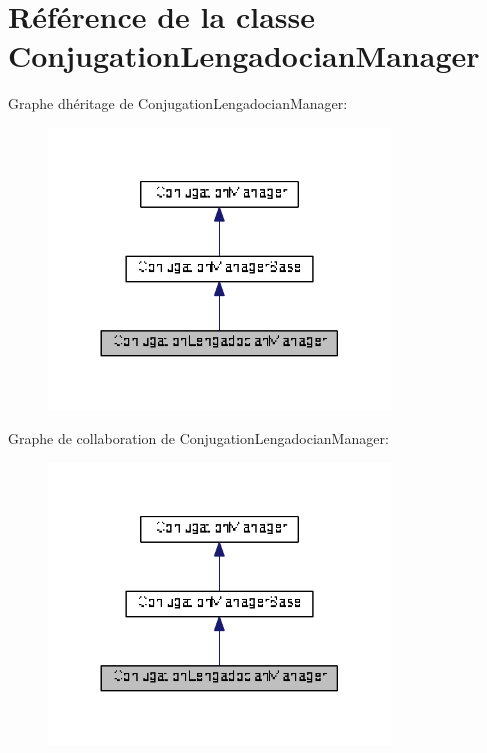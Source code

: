 \hypertarget{class_conjugation_lengadocian_manager}{}\section{Référence de la classe Conjugation\+Lengadocian\+Manager}
\label{class_conjugation_lengadocian_manager}


Graphe d\textquotesingle{}héritage de Conjugation\+Lengadocian\+Manager\+:
\nopagebreak
\begin{figure}[H]
\begin{center}
\leavevmode
\includegraphics[width=257pt]{class_conjugation_lengadocian_manager__inherit__graph}
\end{center}
\end{figure}


Graphe de collaboration de Conjugation\+Lengadocian\+Manager\+:
\nopagebreak
\begin{figure}[H]
\begin{center}
\leavevmode
\includegraphics[width=257pt]{class_conjugation_lengadocian_manager__coll__graph}
\end{center}
\end{figure}
